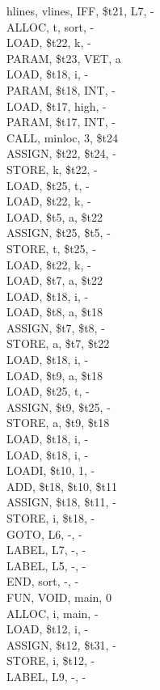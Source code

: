 \documentclass[
	12pt,				%
	oneside,
	a4paper,			%
	english,			%
	french,				%
	spanish,			%
	brazil,				%
	]{abntex2}
\begin{document}
\begin{longtblr}[
  caption = {Código Intermediário},
  label = {tab: ResultadosSortIntermediario},
]{
  hlines,
  vlines,
}
IFF, \$t21, L7, -\\
ALLOC, t, sort, -\\
LOAD, \$t22, k, -\\
PARAM, \$t23, VET, a\\
LOAD, \$t18, i, -\\
PARAM, \$t18, INT, -\\
LOAD, \$t17, high, -\\
PARAM, \$t17, INT, -\\
CALL, minloc, 3, \$t24\\
ASSIGN, \$t22, \$t24, -\\
STORE, k, \$t22, -\\
LOAD, \$t25, t, -\\
LOAD, \$t22, k, -\\
LOAD, \$t5, a, \$t22\\
ASSIGN, \$t25, \$t5, -\\
STORE, t, \$t25, -\\
LOAD, \$t22, k, -\\
LOAD, \$t7, a, \$t22\\
LOAD, \$t18, i, -\\
LOAD, \$t8, a, \$t18\\
ASSIGN, \$t7, \$t8, -\\
STORE, a, \$t7, \$t22\\
LOAD, \$t18, i, -\\
LOAD, \$t9, a, \$t18\\
LOAD, \$t25, t, -\\
ASSIGN, \$t9, \$t25, -\\
STORE, a, \$t9, \$t18\\
LOAD, \$t18, i, -\\
LOAD, \$t18, i, -\\
LOADI, \$t10, 1, -\\
ADD, \$t18, \$t10, \$t11\\
ASSIGN, \$t18, \$t11, -\\
STORE, i, \$t18, -\\
GOTO, L6, -, -\\
LABEL, L7, -, -\\
LABEL, L5, -, -\\
END, sort, -, -\\
FUN, VOID, main, 0\\
ALLOC, i, main, -\\
LOAD, \$t12, i, -\\
ASSIGN, \$t12, \$t31, -\\
STORE, i, \$t12, -\\
LABEL, L9, -, -\\

\end{longtblr}
\end{document}
